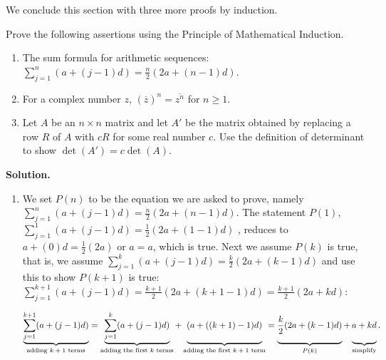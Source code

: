 \documentclass{ximera}
\begin{document}
 

We conclude this section with three more proofs by induction.

\newpage


\begin{example} \label{inductionex02} Prove the following assertions using the Principle of Mathematical Induction.

\begin{enumerate}

\item  The sum formula for arithmetic sequences: $\displaystyle{\sum_{j=1}^{n} (a + (j-1)d) = \frac{n}{2}(2a + (n-1)d)}$.

\item  For a complex number $z$, $\left(\overline{z}\right)^n = \overline{z^{n}}$ for $n \geq 1$.

\item  Let $A$ be an $n \times n$ matrix and let $A'$ be the matrix obtained by replacing a row $R$ of $A$ with $cR$ for some real number $c$.  Use the definition of determinant to show $\det(A') = c \det(A)$.


\end{enumerate}

{\bf Solution.}

\begin{enumerate}

\item We set $P(n)$ to be the equation we are asked to prove, namely  $\displaystyle{\sum_{j=1}^{n} (a + (j-1)d) = \frac{n}{2}(2a + (n-1)d)}$.  The statement $P(1)$,  $\displaystyle{\sum_{j=1}^{1} (a + (j-1)d) = \frac{1}{2}(2a + (1-1)d)}$ ,  reduces to  $a+(0)d = \frac{1}{2} (2a)$ or $a = a$, which is true.  Next we assume $P(k)$ is true, that is, we assume $\displaystyle{\sum_{j=1}^{k} (a + (j-1)d)  = \frac{k}{2}(2a + (k-1)d)}$ and use this to  show $P(k+1)$ is true: $\displaystyle{\sum_{j=1}^{k+1} (a + (j-1)d)  =  \frac{k+1}{2}(2a + (k+1-1)d) = \frac{k+1}{2}(2a + kd)}$:

\[ \underbrace{\displaystyle{\sum_{j=1}^{k+1} (a + (j-1)d)}}_{\text{adding $k+1$ terms}}  = \underbrace{\displaystyle{\sum_{j=1}^{k} (a + (j-1)d)}}_{\text{adding the first $k$ terms}} + \underbrace{(a+((k+1)-1)d ) \vphantom{\displaystyle{\sum_{j=1}^{k+1}}} }_{\text{adding the first $k+1$ term}} =  \underbrace{\frac{k}{2}(2a + (k-1)d)\vphantom{\displaystyle{\sum_{j=1}^{k+1}}} }_{\text{$P(k)$}} +\underbrace{a+kd \vphantom{\displaystyle{\sum_{j=1}^{k+1}}} }_{\text{simplify}}.\]



\end{enumerate}
\end{example}
\end{document}

